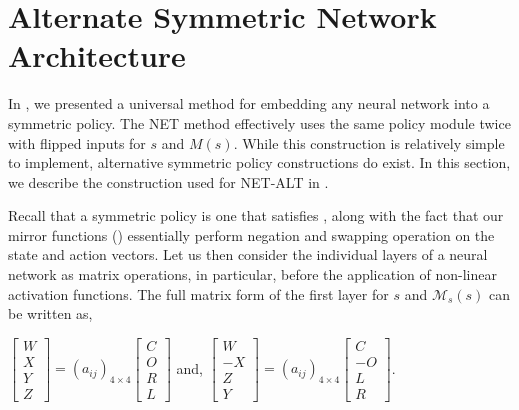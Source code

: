 \section{Alternate Symmetric Network Architecture}
\label{sec:alternate-network}

In , we presented a universal method for embedding any neural network into a symmetric policy.  The NET method effectively uses the same policy module twice with flipped inputs for $s$ and $M(s)$.  While this construction is relatively simple to implement, alternative symmetric policy constructions do exist.  In this section, we describe the construction used for NET-ALT in .



Recall that a symmetric policy is one that satisfies , along with the fact that our mirror functions () essentially perform negation and swapping operation on the state and action vectors.  Let us then consider the individual layers of a neural network as matrix operations, in particular, before the application of non-linear activation functions.  The full matrix form of the first layer for $s$ and $\mathcal{M}_s(s)$ can be written as,

\begin{center}
$\begin{bmatrix} W \\ X \\ Y \\ Z  \end{bmatrix} = (a_{ij})_{4\times4} \begin{bmatrix} C \\ O \\ R \\ L \end{bmatrix}$ and, $\begin{bmatrix} W \\ -X \\ Z \\ Y  \end{bmatrix} = (a_{ij})_{4\times4} \begin{bmatrix} C \\  -O \\  L \\ R \end{bmatrix}$.
\end{center}

